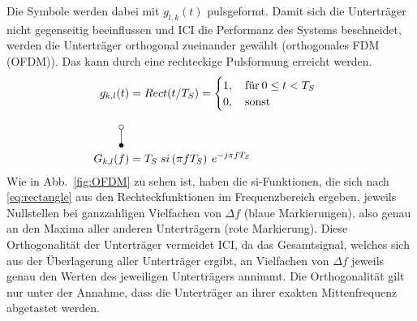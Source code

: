 Die Symbole werden dabei mit $g_{l,k}(t)$ pulsgeformt. Damit sich die Unterträger nicht gegenseitig beeinflussen und \ac{ICI} die Performanz des Systems beschneidet, werden die Unterträger orthogonal zueinander gewählt (orthogonales \ac{FDM} (OFDM)). Das kann durch eine rechteckige Pulsformung erreicht werden. 
\begin{equation}
\label{eq:rectangle}
\begin{aligned}
g_{k,l}(t) &= Rect(t/T_S) = 
    \begin{cases}
    1, \quad \text{für} \: 0 \leq t < T_S \\
    0, \quad \text{sonst}
    \end{cases}\\
\rotatebox{270}{\laplace} \\
G_{k,l}(f) &= T_S \; si\left(\pi f T_S\right)\: e^{-j \pi f T_S}
\end{aligned}
\end{equation}
Wie in Abb.~\ref{fig:OFDM} zu sehen ist, haben die si-Funktionen, die sich nach \ref{eq:rectangle} aus den Rechteckfunktionen im Frequenzbereich ergeben, jeweils Nullstellen bei ganzzahligen Vielfachen von $\Delta f$ (blaue Markierungen), also genau an den Maxima aller anderen Unterträgern (rote Markierung). Diese Orthogonalität der Unterträger vermeidet \ac{ICI}, da das Gesamtsignal, welches sich aus der Überlagerung aller Unterträger ergibt, an Vielfachen von $\Delta f$ jeweils genau den Werten des jeweiligen Unterträgers annimmt. Die Orthogonalität gilt nur unter der Annahme, dass die Unterträger an ihrer exakten Mittenfrequenz abgetastet werden.\\
